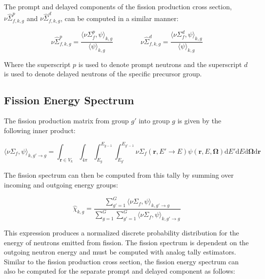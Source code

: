\noindent The prompt and delayed components of the fission production cross section, $\nu\hat{\Sigma}_{f,k,g}^{p}$ and $\nu\hat{\Sigma}_{f,k,g}^{d}$, can be computed in a similar manner:

\begin{equation}
\label{eqn:nu-fiss-macro-specific}
\nu\hat{\Sigma}_{f,k,g}^{p} = \frac{\langle \nu\Sigma_{f}^{p}, \psi \rangle_{k,g}}{\langle \psi \rangle_{k,g}} \qquad \qquad \nu\hat{\Sigma}_{f,k,g}^{d} = \frac{\langle \nu\Sigma_{f}^{d}, \psi \rangle_{k,g}}{\langle \psi \rangle_{k,g}}
\end{equation}

\noindent Where the superscript $p$ is used to denote prompt neutrons and the superscript $d$ is used to denote delayed neutrons of the specific precursor group.

\subsection{Fission Energy Spectrum}
\label{subsubsec:tally-types-chi}

The fission production matrix from group $g'$ into group $g$ is given by the following inner product:

\begin{equation}
\label{eqn:nu-fiss-energies}
\langle \nu\Sigma_{f}, \psi \rangle_{k,g'\rightarrow g} = \int_{\mathbf{r} \in V_{k}} \int_{4\pi} \int_{E_{g}}^{E_{g-1}} \int_{E_{g'}}^{E_{g'-1}} \nu\Sigma_{f}(\mathbf{r},E'\rightarrow E)\psi(\mathbf{r},E,\mathbf{\Omega}) \mathrm{d}E'\mathrm{d}E\mathrm{d}\mathbf{\Omega}\mathrm{d}\mathbf{r}
\end{equation}

\noindent The fission spectrum can then be computed from this tally by summing over incoming and outgoing energy groups:

\begin{equation}
\label{eqn:chi}
\hat{\chi}_{k,g} = \frac{\displaystyle\sum\limits_{g'=1}^{G} \langle \nu\Sigma_{f}, \psi \rangle_{k,g'\rightarrow g}}{\displaystyle\sum\limits_{g=1}^{G} \displaystyle\sum\limits_{g'=1}^{G} \langle \nu\Sigma_{f}, \psi \rangle_{k,g'\rightarrow g}}
\end{equation}

\noindent This expression produces a normalized discrete probability distribution for the energy of neutrons emitted from fission. The fission spectrum is dependent on the outgoing neutron energy and must be computed with analog tally estimators. Similar to the fission production cross section, the fission energy spectrum can also be computed for the separate prompt and delayed component as follows:

